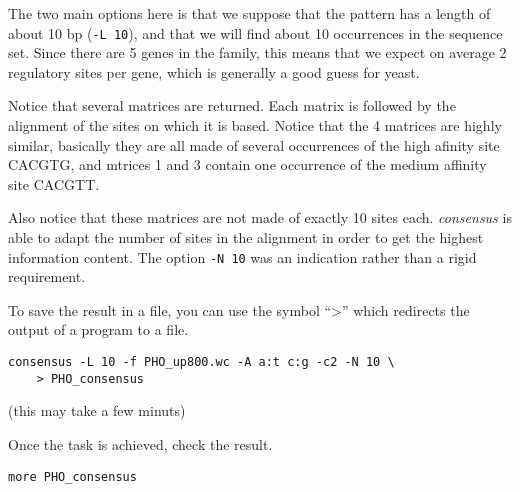 The two main options here is that we suppose that the pattern has a
length of about 10 bp (\texttt{-L 10}), and that we will find about 10
occurrences in the sequence set. Since there are 5 genes in the
family, this means that we expect on average 2 regulatory sites per
gene, which is generally a good guess for yeast.

Notice that several matrices are returned. Each matrix is followed by
the alignment of the sites on which it is based. Notice that the 4
matrices are highly similar, basically they are all made of several
occurrences of the high afinity site CACGTG, and mtrices 1 and 3
contain one occurrence of the medium affinity site CACGTT. 

Also notice that these matrices are not made of exactly 10 sites
each. \textit{consensus} is able to adapt the number of sites in the
alignment in order to get the highest information content. The option
\texttt{-N 10} was an indication rather than a rigid requirement.

To save the result in a file, you can use the symbol ``>'' which
redirects the output of a program to a file. 

\begin{verbatim}
consensus -L 10 -f PHO_up800.wc -A a:t c:g -c2 -N 10 \
    > PHO_consensus
\end{verbatim}

(this may take a few minuts)

Once the task is achieved, check the result.

\begin{verbatim}
more PHO_consensus
\end{verbatim}
